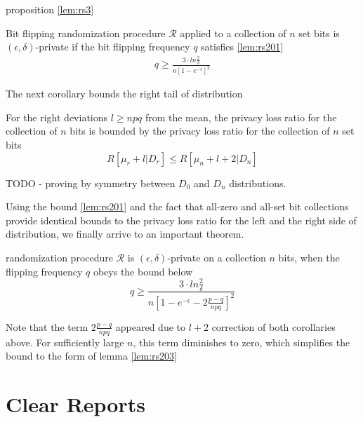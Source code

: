 \documentclass[11pt]{article}
\newcommand{\cR}{\mathcal{R}}
\begin{document}
\newpage 




proposition \ref{lem:rs3} 
 \begin{lem} \label{lem:rs204}  Bit flipping randomization procedure $\cR$ applied to a collection of $n$ set bits is $(\epsilon, \delta)$-private if the bit flipping frequency $q$ satisfies \eqref{lem:rs201}
 \begin{align*}
  q \ge  \frac { 3 \cdot ln\frac{2}{\delta}} { n \left [ 1 - e^{-\epsilon}\right ]^2 }
\end{align*}
\end{lem}

The next corollary bounds the right tail of distribution
\begin{cor}
For the right deviations $l \ge npq$ from the mean, the privacy loss ratio for the collection of $n$ bits is bounded by the privacy loss ratio for the collection of $n$ set bits
\[ R[\mu_r + l|D_r] \le R[\mu_n + l+2 |D_n] \]
\end{cor}
\begin{pf}
TODO - proving by symmetry between $D_0$ and $D_n$ distributions. 
\end{pf}

Using the bound \eqref{lem:rs201} and the fact that all-zero and all-set bit collections provide identical bounds to the privacy loss ratio for the left and the right side of distribution, we finally arrive to an important theorem.
\begin{prop}
randomization procedure $\cR$ is $(\epsilon, \delta)$-private on a collection $n$ bits, when the flipping frequency $q$ obeys the bound below
\begin{equation} \label{eq:fullbound}
q \ge  \frac { 3 \cdot ln\frac{2}{\delta}} { n \left [ 1 - e^{-\epsilon} - 2 \frac{p-q}{npq} \right ]^2 }
\end{equation}
\end{prop}
Note that the term $2 \frac{p-q}{npq}$ appeared due to $l+2$ correction of both corollaries above.  For sufficiently large $n$, this term diminishes to zero, which simplifies the bound to the form of lemma  \eqref{lem:rs203}

\section{Clear Reports}
\end{document}
